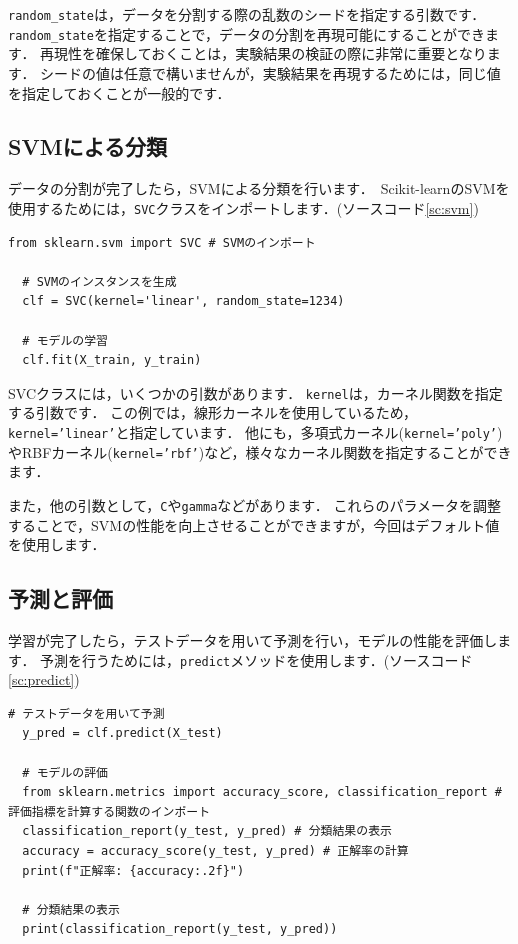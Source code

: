 \documentclass{jarticle}
\begin{document}
\texttt{random\_state}は，データを分割する際の乱数のシードを指定する引数です．
\texttt{random\_state}を指定することで，データの分割を再現可能にすることができます．
再現性を確保しておくことは，実験結果の検証の際に非常に重要となります．
シードの値は任意で構いませんが，実験結果を再現するためには，同じ値を指定しておくことが一般的です．

\subsection{SVMによる分類}
データの分割が完了したら，SVMによる分類を行います．\
Scikit-learnのSVMを使用するためには，\texttt{SVC}クラスをインポートします．(ソースコード\ref{sc:svm})

\begin{lstlisting}[caption=SVMによる分類, label=sc:svm]
  from sklearn.svm import SVC # SVMのインポート

  # SVMのインスタンスを生成
  clf = SVC(kernel='linear', random_state=1234)

  # モデルの学習
  clf.fit(X_train, y_train)
\end{lstlisting}

SVCクラスには，いくつかの引数があります．
\texttt{kernel}は，カーネル関数を指定する引数です．
この例では，線形カーネルを使用しているため，\texttt{kernel='linear'}と指定しています．
他にも，多項式カーネル(\texttt{kernel='poly'})やRBFカーネル(\texttt{kernel='rbf'})など，様々なカーネル関数を指定することができます．

また，他の引数として，\texttt{C}や\texttt{gamma}などがあります．
これらのパラメータを調整することで，SVMの性能を向上させることができますが，今回はデフォルト値を使用します．

\subsection{予測と評価}
学習が完了したら，テストデータを用いて予測を行い，モデルの性能を評価します．
予測を行うためには，\texttt{predict}メソッドを使用します．(ソースコード\ref{sc:predict})

\begin{lstlisting}[caption=予測と評価, label=sc:predict]
  # テストデータを用いて予測
  y_pred = clf.predict(X_test)

  # モデルの評価
  from sklearn.metrics import accuracy_score, classification_report # 評価指標を計算する関数のインポート
  classification_report(y_test, y_pred) # 分類結果の表示
  accuracy = accuracy_score(y_test, y_pred) # 正解率の計算
  print(f"正解率: {accuracy:.2f}")

  # 分類結果の表示
  print(classification_report(y_test, y_pred))
\end{lstlisting}
\end{document}

